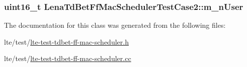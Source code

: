 \subsubsection[{\texorpdfstring{m\+\_\+n\+User}{m_nUser}}]{\setlength{\rightskip}{0pt plus 5cm}uint16\+\_\+t Lena\+Td\+Bet\+Ff\+Mac\+Scheduler\+Test\+Case2\+::m\+\_\+n\+User\hspace{0.3cm}{\ttfamily [private]}}\hypertarget{classLenaTdBetFfMacSchedulerTestCase2_ae922bc33ece9e8c61eaf4677b8b78f6b}{}\label{classLenaTdBetFfMacSchedulerTestCase2_ae922bc33ece9e8c61eaf4677b8b78f6b}


The documentation for this class was generated from the following files\+:\begin{DoxyCompactItemize}
\item 
lte/test/\hyperlink{lte-test-tdbet-ff-mac-scheduler_8h}{lte-\/test-\/tdbet-\/ff-\/mac-\/scheduler.\+h}\item 
lte/test/\hyperlink{lte-test-tdbet-ff-mac-scheduler_8cc}{lte-\/test-\/tdbet-\/ff-\/mac-\/scheduler.\+cc}\end{DoxyCompactItemize}
